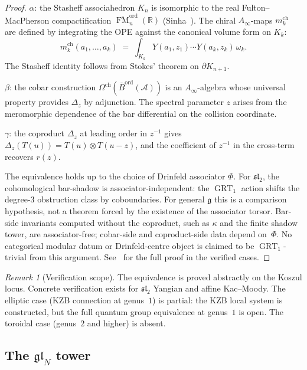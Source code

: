 \documentclass[11pt,reqno]{amsart}
\theoremstyle{definition}
\theoremstyle{remark}
\newtheorem{remark}[theorem]{Remark}
\newcommand{\cA}{\mathcal{A}}
\newcommand{\Ainf}{A_{\infty}}
\DeclareMathOperator{\FM}{FM}
\DeclareMathOperator{\GRT}{GRT}
\newcommand{\fg}{\mathfrak{g}}
\newcommand{\Barord}{\overline{B}^{\mathrm{ord}}}
\newcommand{\RR}{\mathbb{R}}
\numberwithin{equation}{section}
\begin{document}
\begin{proof}
$\alpha$: the Stasheff associahedron $K_n$ is isomorphic to
the real Fulton--MacPherson compactification
$\overline{\FM}_n^{\mathrm{ord}}(\RR)$
(Sinha~\cite{Sinha04}). The chiral $\Ainf$-maps
$m_k^{\mathrm{ch}}$ are defined by integrating the OPE against
the canonical volume form on $K_k$:
\[
  m_k^{\mathrm{ch}}(a_1, \ldots, a_k)
  \;=\;
  \int_{K_k} Y(a_1, z_1) \cdots Y(a_k, z_k)\, \omega_k.
\]
The Stasheff identity follows from Stokes' theorem on
$\partial K_{n+1}$.

$\beta$: the cobar construction
$\Omega^{\mathrm{ch}}(\Barord(\cA))$ is an $\Ainf$-algebra
whose universal property provides $\Delta_z$ by adjunction.
The spectral parameter $z$ arises from the meromorphic
dependence of the bar differential on the collision coordinate.

$\gamma$: the coproduct $\Delta_z$ at leading order in $z^{-1}$
gives $\Delta_z(T(u)) = T(u) \otimes T(u-z)$, and the
coefficient of $z^{-1}$ in the cross-term recovers $r(z)$.

The equivalence holds up to the choice of Drinfeld associator
$\Phi$. For $\mathfrak{sl}_2$, the cohomological bar-shadow is
associator-independent: the $\GRT_1$ action shifts the degree-$3$
obstruction class by coboundaries. For general $\fg$ this is a
comparison hypothesis, not a theorem forced by the existence of the
associator torsor. Bar-side invariants computed without the
coproduct, such as $\kappa$ and the finite shadow tower, are
associator-free; cobar-side and coproduct-side data depend on~$\Phi$.
No categorical modular datum or Drinfeld-centre object is claimed to
be $\GRT_1$-trivial from this argument. See~\cite[Chapter~9]{Lor26}
for the full proof in the verified cases.
\end{proof}

\begin{remark}[Verification scope]
\label{rem:verification-scope}
The equivalence is proved abstractly on the Koszul locus.
Concrete verification exists for $\mathfrak{sl}_2$ Yangian and
affine Kac--Moody. The elliptic case (KZB connection at
genus~$1$) is partial: the KZB local system is constructed, but the
full quantum group equivalence at genus~$1$ is open. The toroidal
case (genus~$2$ and higher) is absent.
\end{remark}

\subsection{The $\mathfrak{gl}_N$ tower}
\end{document}
